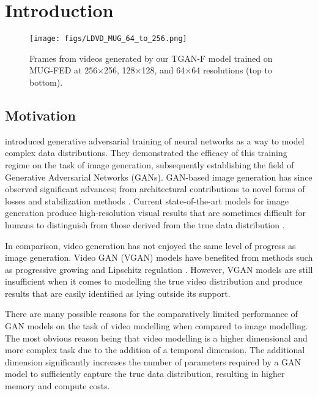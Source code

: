 \documentclass[a4paper,fleqn]{cas-sc}
\begin{document}
\maketitle


\section{Introduction}

\begin{figure}[pos=!h]
    \centering
    \texttt{[image: figs/LDVD\_MUG\_64\_to\_256.png]}
    
    \caption{Frames from videos generated by our TGAN-F model trained on MUG-FED at 256$\times$256,
128$\times$128, and 64$\times$64 resolutions (top to bottom).} 
    \label{fig:MUG_ldvd_64_256}
\end{figure}

\subsection{Motivation}
\citet{GoodfellowPMXWOCB14generative} introduced generative adversarial training of neural networks as a way to model complex data distributions. They demonstrated the efficacy of this training regime on the task of image generation, subsequently establishing the field of Generative Adversarial Networks (GANs). GAN-based image generation has since observed significant advances; from architectural contributions \cite{RadfordMC15unsupervised,zhangGMO2018attention, karras2018progressive} to novel forms of losses \cite{ArjovskyCB17wasserstein,jolicoeur-martineau2018relativistic} and stabilization methods \cite{MiyatoKKY18spectral,HeuselRUNH17updaterule, salimansGZCRCC2016improved,Gulrajani2017improved}. Current state-of-the-art models for image generation produce high-resolution visual results that are sometimes difficult for humans to distinguish from those derived from the true data distribution \cite{brockDS2018large,karrasLA2018style}.

In comparison, video generation has not enjoyed the same level of progress as image generation. Video GAN (VGAN) models have benefited from methods such as progressive growing \cite{AcharyaHPG2018towards} and Lipschitz regulation \cite{SaitoMS17temporal}. However, VGAN models are still insufficient when it comes to modelling the true video distribution and produce results that are easily identified as lying outside its support. 


There are many possible reasons for the comparatively limited performance of GAN models on the task of video modelling when compared to image modelling. The most obvious reason being that video modelling is a higher dimensional and more complex task due to the addition of a temporal dimension. The additional dimension significantly increases the number of parameters required by a GAN model to sufficiently capture the true data distribution, resulting in higher memory and compute costs. 
\end{document}

